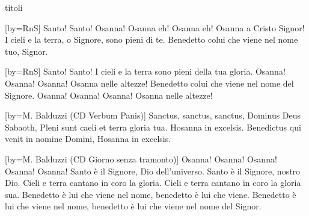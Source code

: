 
\begin{songs}{titoli}

[by={RnS}]
\beginchorus
Santo! Santo! Osanna! 
Osanna eh! Osanna eh! Osanna a Cristo Signor! 
\endchorus
\beginverse*
I cieli e la terra, o Signore, sono pieni di te. 
\endverse
\beginverse*
Benedetto colui che viene nel nome tuo, Signor. 
\endverse
\endsong

[by={RnS}]
\beginchorus
Santo! Santo! 
\endchorus
\beginverse*
I cieli e la terra sono pieni della tua gloria.
Osanna! Osanna! Osanna! Osanna nelle altezze! 
\endverse
\beginverse*
Benedetto colui che viene nel nome del Signore.
Osanna! Osanna! Osanna! Osanna nelle altezze! 
\endverse
\endsong

[by={M. Balduzzi (CD Verbum Panis)}]
\beginverse*
Sanctus, sanctus, sanctus, 
Dominus Deus Sabaoth, 
Pleni sunt caeli et terra gloria tua.
Hosanna in excelsis. 
\endverse
\beginverse*
Benedictus qui venit in nomine Domini, 
Hosanna in excelsis. 
\endverse
\endsong

[by={M. Balduzzi (CD Giorno senza tramonto)}]
\beginchorus
Osanna! Osanna!
Osanna! Osanna!
Osanna!
\endchorus
\beginverse*
Santo è il Signore, Dio dell'universo.
Santo è il Signore, nostro Dio.
Cieli e terra cantano in coro la gloria.
Cieli e terra cantano in coro la gloria sua.
\endverse
\beginverse*
Benedetto è lui che viene nel nome,
benedetto è lui che viene.
Benedetto è lui che viene nel nome,
benedetto è lui che viene nel nome del Signor.
\endverse
\endsong


\end{songs}
